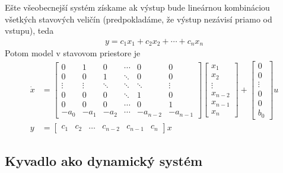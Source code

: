 \documentclass[a4paper, 10pt, ]{article}
\begin{document}
Ešte všeobecnejší systém získame ak výstup bude lineárnou kombináciou všetkých stavových veličín (predpokladáme, že výstup nezávisí priamo od vstupu), teda
\begin{align}
	y = c_1 x_1 + c_2 x_2 + \cdots + c_n x_n
\end{align}
Potom model v stavovom priestore je
\begin{subequations}
\begin{align}
	\dot{x}
	&
	=
	\begin{bmatrix}
  	0      & 1      & 0      & \cdots & 0      & 0      \\
   	0      & 0      & 1      & \ddots & 0      & 0      \\
    \vdots & \vdots & \ddots & \ddots & \ddots & \vdots \\
    0      & 0      & 0      & \ddots & 1      & 0      \\
    0      & 0      & 0      & \cdots & 0      & 1      \\
   	-a_0   & -a_1   & -a_2   & \cdots &-a_{n-2}&-a_{n-1}
	\end{bmatrix}
	\begin{bmatrix}
		x_1 \\ x_2 \\ \vdots \\ x_{n-2} \\x_{n-1}  \\ x_n
	\end{bmatrix} +
	\begin{bmatrix}
		0 \\ 0 \\ \vdots \\ 0 \\0  \\ b_0
	\end{bmatrix}
	u
\\
y &= \begin{bmatrix}
		c_1& c_2 & \hdots & c_{n-2} & c_{n-1}  &c_n
	\end{bmatrix}
	x
\end{align}
\end{subequations}




\subsection{Kyvadlo ako dynamický systém}
\end{document}
